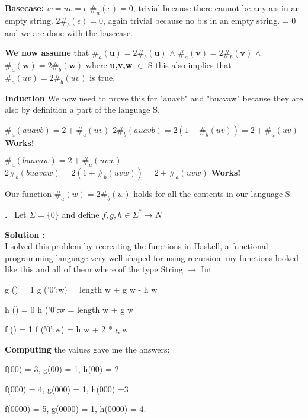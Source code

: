 \documentclass{article}
\newcounter{problem}
\newcounter{solution}
\newcommand\Problem{%
  \stepcounter{problem}%
  \textbf{\theproblem.}~%
  \setcounter{solution}{0}%
}
\newcommand\ASolution{%
  \stepcounter{solution}%
  \textbf{Solution \thesolution:}\\%
}
\begin{document}
\textbf{Basecase:} $w = uv = \epsilon$ \newline
$\#_a (\epsilon) = 0$, trivial because there cannot be any a:s in an empty 
string.\newline
$2\#_b (\epsilon) = 0$, again trivial because no b:s in an empty string. = 0 and we are done with the basecase.

\textbf{We now assume} that $\#_a (\textbf{u}) = 2\#_b (\textbf{u})$ $\wedge$ $\#_a
(\textbf{v}) = 2\#_b (\textbf{v})$ $\wedge$ $\#_a (\textbf{w}) = 2\#_b 
(\textbf{w})$ \newline
where \textbf{u,v,w} $\in$ S this also implies that $\#_a (uv) = 2\#_b(uv)$ is 
true.

\textbf{Induction}\newline
We now need to prove this for "auavb" and "buavaw" because they are also by 
definition a part of the language S.

$\#_a (auavb) = 2 + \#_a(uv)$ \newline
$2\#_b (auavb) = 2(1 + \#_b (uv)) = 2 + \#_a(uv)$ \newline
\textbf{Works!}

$\#_a (buavaw) = 2 + \#_a (uvw)$ \newline
$2\#_b (buavaw) = 2(1 + \#_b (uvw)) = 2 + \#_a (uvw)$ \newline
\textbf{Works!}

Our function $\#_a(w) = 2\#_b(w)$ holds for all the contents in our language S.

\hfill
\square
\newpage

\Problem Let $\Sigma = \{0\}$ and define $f,g,h \in \Sigma^* \rightarrow N$

\ASolution I solved this problem by recreating the functions in Haskell, a 
functional programming language very well shaped for using recursion. my functions looked like this and all of them where of the type String $\rightarrow$ Int

g () = 1 \newline
g ('0':w) = length w + g w - h w

h () = 0 \newline
h ('0':w = length w + g w

f () = 1 \newline
f ('0':w) = h w + 2 * g w

\textbf{Computing} the values gave me the answers:
\begin{center}
    f(00) = 3, g(00) = 1, h(00) = 2
    
    f(000) = 4, g(000) = 1, h(000) =3
    
    f(0000) = 5, g(0000) = 1, h(0000) = 4.
\end{center}
\end{document}
